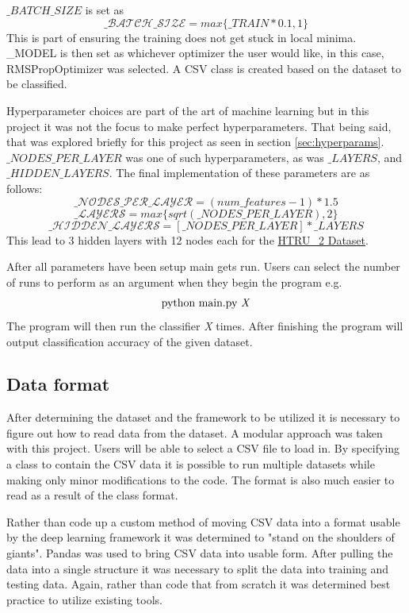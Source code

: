 \documentclass{article}
\begin{document}
  $\_BATCH\_SIZE$ is set as 
  \[\mathcal{\_BATCH\_SIZE}=max\{\_TRAIN*0.1, 1\}\]
  This is part of ensuring the training does not get stuck in local minima. \_MODEL is then set as whichever optimizer the user would like, in this case, 
  RMSPropOptimizer was selected. A CSV class is created based on the dataset to 
  be classified. 

  Hyperparameter choices are part of the art of machine learning but in this 
  project it was not the focus to make perfect hyperparameters. That being 
  said, that was explored briefly for this project as seen in section 
  \ref{sec:hyperparams}. $\_NODES\_PER\_LAYER$ was one of such hyperparameters, 
  as was $\_LAYERS$, and $\_HIDDEN\_LAYERS$. The final implementation of these 
  parameters are as follows:
  \[\mathcal{\_NODES\_PER\_LAYER}=(num\_features - 1) * 1.5\]
  \[\mathcal{\_LAYERS}=max\{sqrt(\_NODES\_PER\_LAYER), 2\}\]
  \[\mathcal{\_HIDDEN\_LAYERS}=[\_NODES\_PER\_LAYER] * \_LAYERS\]
  This lead to 3 hidden layers with 12 nodes each for the \href{https://archive.ics.uci.edu/ml/datasets/HTRU2}{HTRU\_2 Dataset}.

  After all parameters have been setup main gets run. Users can select the 
  number of runs to perform as an argument when they begin the program e.g. 
  \[\textnormal{python\ main.py \textit{X}}\]  
  The program will then run the classifier \textit{X} times. After finishing 
  the program will output classification accuracy of the given dataset.



\subsection{Data format}
  After determining the dataset and the framework to be utilized it is 
  necessary to figure out how to read data from the dataset. A modular approach 
  was taken with this project. Users will be able to select a CSV file to load 
  in. By specifying a class to contain the CSV data it is possible to run 
  multiple datasets while making only minor modifications to the code. The 
  format is also much easier to read as a result of the class format.

  Rather than code up a custom method of moving CSV data into a format usable 
  by the deep learning framework it was determined to "stand on the shoulders 
  of giants". Pandas was used to bring CSV data into usable form. After pulling 
  the data into a single structure it was necessary to split the data into 
  training and testing data. Again, rather than code that from scratch it was 
  determined best practice to utilize existing tools. 
\end{document}
